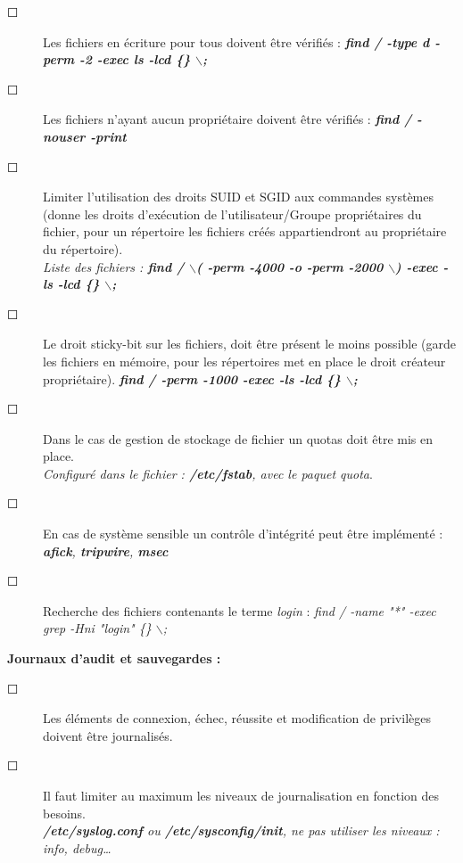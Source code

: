 \documentclass[a4paper,11pt]{article}				    %
\begin{document}
{\begin{description}
   \item[$\Square$] Les fichiers en \'ecriture pour tous doivent \^etre v\'erifi\'es : {\sl \color{blue}\textbf{find / -type d -perm -2 -exec ls -lcd \{\} $\backslash$;}}

   \item[$\Square$] Les fichiers n'ayant aucun propri\'etaire doivent \^etre v\'erifi\'es : {\sl \color{blue}\textbf{find / -nouser -print}}

   \item[$\Square$] Limiter l'utilisation des droits SUID et SGID aux commandes syst\`emes (donne les droits d'ex\'ecution de l'utilisateur/Groupe propri\'etaires du fichier, pour un r\'epertoire les fichiers cr\'e\'es appartiendront au propri\'etaire du r\'epertoire).\\
{\sl \color{blue}Liste des fichiers :  \textbf{find / $\backslash$( -perm -4000 -o -perm -2000 $\backslash$) -exec -ls -lcd \{\} $\backslash$;}}
   \item[$\Square$] Le droit sticky-bit sur les fichiers, doit \^etre pr\'esent le moins possible (garde les fichiers en m\'emoire, pour les r\'epertoires met en place le droit cr\'eateur propri\'etaire). {\sl \color{blue}\textbf{find / -perm -1000 -exec -ls -lcd \{\} $\backslash$;}}

   \item[$\Square$] Dans le cas de gestion de stockage de fichier un quotas doit \^etre mis en place.\\
{\sl \color{blue}Configur\'e dans le fichier : \textbf{/etc/fstab}, avec le paquet quota}.

   \item[$\Square$] En cas de syst\`eme sensible un contr\^ole d'int\'egrit\'e peut \^etre impl\'ement\'e : 
{\sl \color{blue}\textbf{afick}, \textbf{tripwire}, \textbf{msec}}

   \item[$\Square$] Recherche des fichiers contenants le terme \textit{login} :
   {\sl \color{blue}find / -name "*" -exec grep -Hni "login" \{\} $\backslash$;}

\end{description}
\vskip-0.1cm
\textbf{Journaux d'audit et sauvegardes :}
\begin{description}
	\item[$\Square$] Les \'el\'ements de connexion, \'echec, r\'eussite et modification de privil\`eges doivent \^etre journalis\'es.
	\item[$\Square$] Il faut limiter au maximum les niveaux de journalisation en fonction des besoins.\\
	{\sl \color{blue}\textbf{/etc/syslog.conf} ou \textbf{/etc/sysconfig/init}, ne pas utiliser les niveaux : info, debug\dots{}}


\end{description}}
\end{document}
